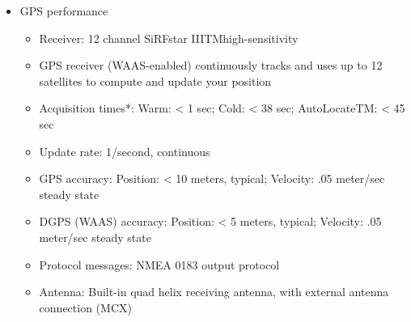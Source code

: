 \begin{itemize}
\item GPS performance 
  \begin{itemize}
	\item Receiver: 12 channel SiRFstar IIITMhigh-sensitivity 
	\item GPS receiver (WAAS-enabled) continuously tracks and uses up to 12 satellites to compute and update your position 
	\item Acquisition times*: Warm: < 1 sec; Cold: < 38 sec; AutoLocateTM: < 45 sec 
	\item Update rate: 1/second, continuous 
	\item GPS accuracy: Position: < 10 meters, typical; Velocity: .05 meter/sec steady state 
	\item DGPS (WAAS) accuracy: Position: < 5 meters, typical; Velocity: .05 meter/sec steady state 
	\item Protocol messages: NMEA 0183 output protocol 
	\item Antenna: Built-in quad helix receiving antenna, with external antenna connection (MCX)
  \end{itemize}

\end{itemize}